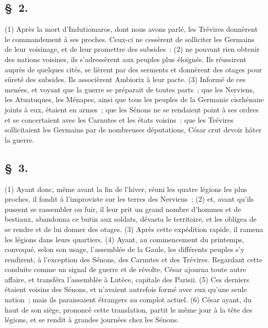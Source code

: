 \documentclass[french,twoside]{book} %
\begin{document}
\subsection[{§ 2.}]{ \textsc{§ 2.} }
\noindent (1) Après la mort d’Indutiomaros, dont nous avons parlé, les Trévires donnèrent le commandement à ses proches. Ceux-ci ne cessèrent de solliciter les Germains de leur voisinage, et de leur promettre des subsides : (2) ne pouvant rien obtenir des nations voisines, ils s’adressèrent aux peuples plus éloignés. Ils réussirent auprès de quelques cités, se lièrent par des serments et donnèrent des otages pour sûreté des subsides. Ils associèrent Ambiorix à leur pacte. (3) Informé de ces menées, et voyant que la guerre se préparait de toutes parts ; que les Nerviens, les Atuatuques, les Ménapes, ainsi que tous les peuples de la Germanie cisrhénane joints à eux, étaient en armes ; que les Sénons ne se rendaient point à ses ordres et se concertaient avec les Carnutes et les états voisins : que les Trévires sollicitaient les Germains par de nombreuses députations, César crut devoir hâter la guerre.
\subsection[{§ 3.}]{ \textsc{§ 3.} }
\noindent (1) Ayant donc, même avant la fin de l’hiver, réuni les quatre légions les plus proches, il fondit à l’improviste sur les terres des Nerviens ; (2) et, avant qu’ils pussent se rassembler ou fuir, il leur prit un grand nombre d’hommes et de bestiaux, abandonna ce butin aux soldats, dévasta le territoire, et les obligea de se rendre et de lui donner des otages. (3) Après cette expédition rapide, il ramena les légions dans leurs quartiers. (4) Ayant, au commencement du printemps, convoqué, selon son usage, l’assemblée de la Gaule, les différents peuples s’y rendirent, à l’exception des Sénons, des Carnutes et des Trévires. Regardant cette conduite comme un signal de guerre et de révolte, César ajourna toute autre affaire, et transféra l’assemblée à Lutèce, capitale des Parisii. (5) Ces derniers étaient voisins des Sénons, et n’avaient autrefois formé avec eux qu’une seule nation ; mais ils paraissaient étrangers au complot actuel. (6) César ayant, du haut de son siège, prononcé cette translation, partit le même jour à la tête des légions, et se rendit à grandes journées chez les Sénons.
\end{document}
